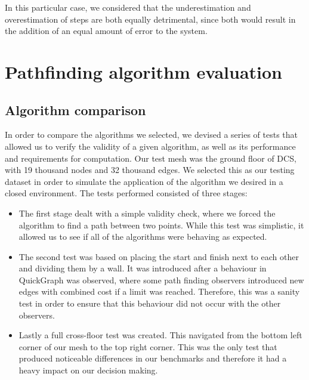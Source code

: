 \documentclass[12pt,a4paper]{report}
\begin{document}
In this particular case, we considered that the underestimation and overestimation of steps are both equally detrimental, since both would result in the addition of an equal amount of error to the system.


\section{Pathfinding algorithm evaluation}
\label{sec:pathTest}
\subsection{Algorithm comparison}
In order to compare the algorithms we selected, we devised a series of tests that allowed us to verify the validity of a given algorithm, as well as its performance and requirements for computation. Our test mesh was the ground floor of DCS, with 19 thousand nodes and 32 thousand edges. We selected this as our testing dataset in order to simulate the application of the algorithm we desired in a closed environment. The tests performed consisted of three stages: 

\begin{itemize}
	\item The first stage dealt with a simple validity check, where we forced the algorithm to find a path between two points. While this test was simplistic, it allowed us to see if all of the algorithms were behaving as expected. 
	\item The second test was based on placing the start and finish next to each other and dividing them by a wall. It was introduced after a behaviour in QuickGraph was observed, where some path finding observers introduced new edges with combined cost if a limit was reached. Therefore, this was a sanity test in order to ensure that this behaviour did not occur with the other observers.
	\item Lastly a full cross-floor test was created. This navigated from the bottom left corner of our mesh to the top right corner. This was the only test that produced noticeable differences in our benchmarks and therefore it had a heavy impact on our decision making.
\end{itemize}
\end{document}
